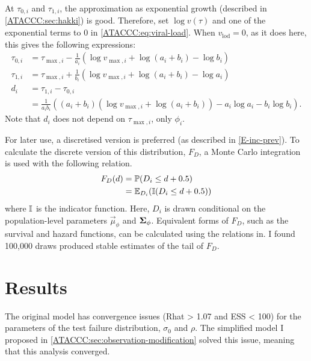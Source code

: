 \documentclass[thesis.tex]{subfiles}
\begin{document}
At $\tau_{0,i}$ and $\tau_{1,i}$, the approximation as exponential growth (described in \cref{ATACCC:sec:hakki}) is good.
Therefore, set $\log v(\tau)$ and one of the exponential terms to 0 in \cref{ATACCC:eq:viral-load}.
When $v_\text{lod} = 0$, as it does here, this gives the following expressions:
$$
\begin{aligned}
\tau_{0,i}
&= \tau_{\max,i} - \frac{1}{a_i} \left(\log v_{\max,i} + \log(a_i + b_i) - \log b_i \right) \\
\tau_{1,i}
&= \tau_{\max,i} + \frac{1}{b_i} \left(\log v_{\max,i} + \log(a_i + b_i) - \log a_i \right) \\
d_i
&= \tau_{1,i} - \tau_{0,i}  \\
&= \frac{1}{a_i b_i} \left( (a_i + b_i) (\log v_{\max,i} + \log(a_i + b_i)) - a_i \log a_i - b_i \log b_i \right).
\end{aligned}
$$
Note that $d_i$ does not depend on $\tau_{\max,i}$, only $\phi_i$.

For later use, a discretised version is preferred (as described in \cref{E-inc-prev}).
To calculate the discrete version of this distribution, $F_D$, a Monte Carlo integration is used with the following relation.
\begin{align}
  F_D(d)
  &= \operatorname{\mathbb{P}}(D_i \leq d + 0.5) \\
  &= \operatorname{\mathbb{E}}_{D_i}(\operatorname{\mathbb{I}}(D_i \leq d + 0.5)) 
\end{align}
where $\operatorname{\mathbb{I}}$ is the indicator function.
Here, $D_i$ is drawn conditional on the population-level parameters $\vec{\mu}_\phi$ and $\bm{\Sigma}_\phi$.
Equivalent forms of $F_D$, such as the survival and hazard functions, can be calculated using the relations in.
I found 100,000 draws produced stable estimates of the tail of $F_D$.

\section{Results} \label{ATACCC:sec:results-discussion}


The original \textcite{hakkiOnset} model has convergence issues (Rhat > 1.07 and ESS < 100) for the parameters of the test failure distribution, $\sigma_0$ and $\rho$.
The simplified model I proposed in \cref{ATACCC:sec:observation-modification} solved this issue, meaning that this analysis converged.
\end{document}

